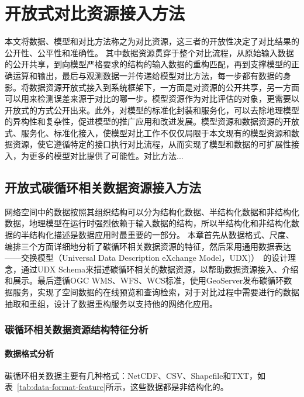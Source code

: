 \chapter{开放式对比资源接入方法}
本文将数据、模型和对比方法称之为对比资源，这三者的开放性决定了对比结果的公开性、公平性和准确性。
其中数据资源贯穿于整个对比流程，从原始输入数据的公开共享，到向模型严格要求的结构的输入数据的重构匹配，再到支撑模型的正确运算和输出，最后与观测数据一并传递给模型对比方法，每一步都有数据的身影。将数据资源开放式接入到系统框架下，一方面是对资源的公开共享，另一方面可以用来检测误差来源于对比的哪一步。模型资源作为对比评估的对象，更需要以开放式的方式公开出来。此外，对模型的标准化封装和服务化，可以去除地理模型的异构性和复杂性，促进模型的推广应用和改进发展。模型资源和数据资源的开放式、服务化、标准化接入，使模型对比工作不仅仅局限于本文现有的模型资源和数据资源，使它遵循特定的接口执行对比流程，从而实现了模型和数据的可扩展性接入，为更多的模型对比提供了可能性。对比方法...

\section{开放式碳循环相关数据资源接入方法}
网络空间中的数据按照其组织结构可以分为结构化数据、半结构化数据和非结构化数据，地理模型在运行时强烈依赖于输入数据的结构，所以半结构化和非结构化数据的半结构化描述是数据应用时最重要的一部分。
本章首先从数据格式、尺度、编排三个方面详细地分析了碳循环相关数据资源的特征，然后采用通用数据表达——交换模型（Universal Data Description eXchange Model，UDX)）~\cite{乐松山2016面向地理模型共享与集成的数据适配方法研究}的设计理念，通过UDX Schema来描述碳循环相关的数据资源，以帮助数据资源接入、介绍和展示。最后遵循OGC WMS、WFS、WCS标准，使用GeoServer发布碳循环数据服务，实现了空间数据的在线预览和查询检索，对于对比过程中需要进行的数据抽取和重组，设计了数据重构服务以支持他的网络化应用。

\subsection{碳循环相关数据资源结构特征分析}
\subsubsection{数据格式分析}
碳循环相关数据主要有几种格式：NetCDF、CSV、Shapefile和TXT，如表~\ref{tab:data-format-feature}所示，这些数据都是非结构化的。

